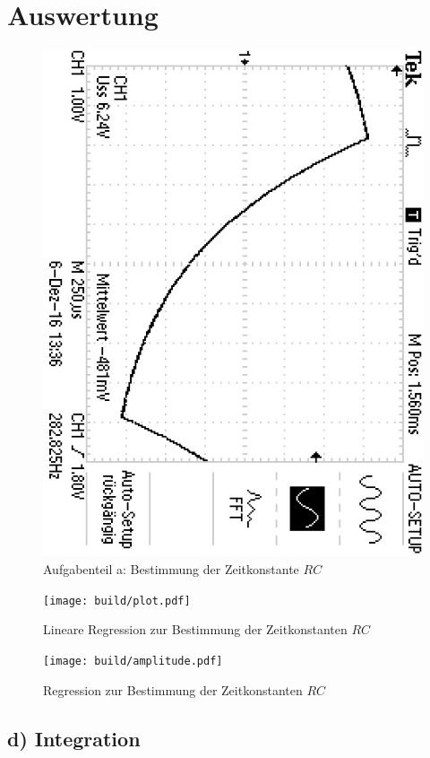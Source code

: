 \section{Auswertung}
\label{sec:Auswertung}

\begin{figure}
	\centering
	\includegraphics[angle=90]{bilder/F0000TEK.JPG}
	\caption{Aufgabenteil a: Bestimmung der Zeitkonstante $RC$}
	\label{fig:plotrc}
\end{figure}
\begin{figure}
  \centering
  \texttt{[image: build/plot.pdf]}
  \caption{Lineare Regression zur Bestimmung der Zeitkonstanten $RC$}
  \label{fig:plota}
\end{figure}
\begin{figure}
  \centering
  \texttt{[image: build/amplitude.pdf]}
  \caption{Regression zur Bestimmung der Zeitkonstanten $RC$}
  \label{fig:plota}
\end{figure}

\subsection{d) Integration}

